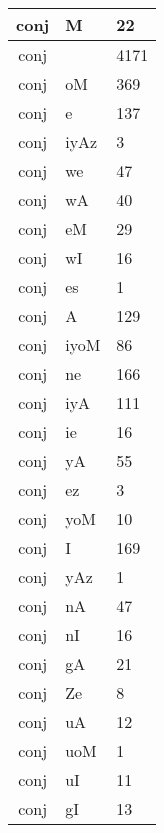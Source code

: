 \documentclass[a4 paper]{article}
\begin{document}
\begin{longtable}{cp{}p{}}
conj & M & 22\\ \midrule conj &  & 4171\\ \midrule conj & oM & 369\\ \midrule conj & e & 137\\ \midrule conj & iyAz & 3\\ \midrule conj & we & 47\\ \midrule conj & wA & 40\\ \midrule conj & eM & 29\\ \midrule conj & wI & 16\\ \midrule conj & es & 1\\ \midrule conj & A & 129\\ \midrule conj & iyoM & 86\\ \midrule conj & ne & 166\\ \midrule conj & iyA & 111\\ \midrule conj & ie & 16\\ \midrule conj & yA & 55\\ \midrule conj & ez & 3\\ \midrule conj & yoM & 10\\ \midrule conj & I & 169\\ \midrule conj & yAz & 1\\ \midrule conj & nA & 47\\ \midrule conj & nI & 16\\ \midrule conj & gA & 21\\ \midrule conj & Ze & 8\\ \midrule conj & uA & 12\\ \midrule conj & uoM & 1\\ \midrule conj & uI & 11\\ \midrule conj & gI & 13\
\end{longtable}
\end{document}

